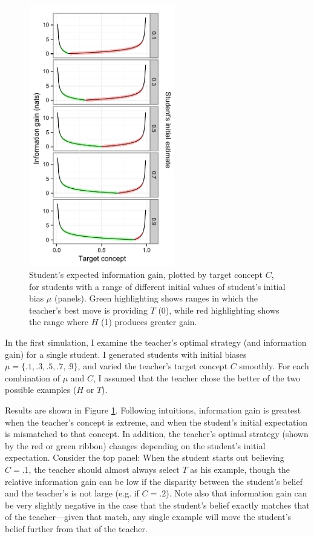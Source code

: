 \documentclass[10pt,letterpaper]{article}
\begin{document}
\begin{figure}[t]
\begin{center}
\includegraphics[width=2.5in]{figures/single_student_gain.pdf}
\end{center}
\caption{\label{fig:student} Student's expected information gain, plotted by target concept $C$, for students with a range of different initial values of student's initial bias $\mu$ (panels). Green highlighting shows ranges in which the teacher's best move is providing $T$ (0), while red highlighting shows the range where $H$ (1) produces greater gain.}
\end{figure}

In the first simulation, I examine the teacher's optimal strategy (and information gain) for a single student. I generated students with initial biases $\mu= \{.1, .3, .5, .7, .9\}$, and varied the teacher's target concept $C$ smoothly. For each combination of $\mu$ and $C$, I assumed that the teacher chose the better of the two possible examples ($H$ or $T$). 

Results are shown in Figure \ref{fig:student}. Following intuitions, information gain is greatest when the teacher's concept is extreme, and when the student's initial expectation is mismatched to that concept. In addition, the teacher's optimal strategy (shown by the red or green ribbon) changes depending on the student's initial expectation. Consider the top panel: When the student starts out believing $C=.1$, the teacher should almost always select $T$ as his example, though the relative information gain can be low if the disparity between the student's belief and the teacher's is not large (e.g. if $C=.2$). Note also that information gain can be very slightly negative in the case that the student's belief exactly matches that of the teacher---given that match, any single example will move the student's belief further from that of the teacher. 
\end{document}
